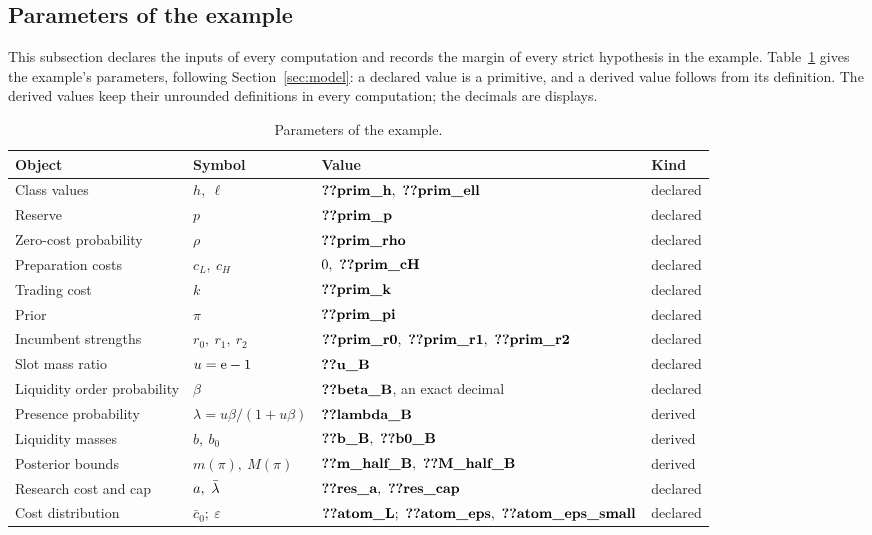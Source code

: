 \subsection{Parameters of the example}\label{app:parameters}

This subsection declares the inputs of every computation and records the margin of every strict hypothesis in the
example. Table~\ref{tab:a9-declarations} gives the example's parameters, following Section~\ref{sec:model}: a
declared value is a primitive, and a derived value follows from its definition. The derived values keep
their unrounded definitions in every computation; the decimals are displays.

\begin{table}[ht]
\centering
\caption{Parameters of the example.}\label{tab:a9-declarations}
\footnotesize
\begin{tabular}{@{}llll@{}}
\toprule
Object & Symbol & Value & Kind\\
\midrule
Class values & \(h,\ \ell\) & \(\reg{prim_h},\ \reg{prim_ell}\) & declared\\
Reserve & \(p\) & \(\reg{prim_p}\) & declared\\
Zero-cost probability & \(\rho\) & \(\reg{prim_rho}\) & declared\\
Preparation costs & \(c_L,\ c_H\) & \(0,\ \reg{prim_cH}\) & declared\\
Trading cost & \(k\) & \(\reg{prim_k}\) & declared\\
Prior & \(\pi\) & \(\reg{prim_pi}\) & declared\\
Incumbent strengths & \(r_0,\ r_1,\ r_2\) & \(\reg{prim_r0},\ \reg{prim_r1},\ \reg{prim_r2}\) & declared\\
Slot mass ratio & \(u=\mathrm{e}-1\) & \(\reg{u_B}\) & declared\\
Liquidity order probability & \(\beta\) & \(\reg{beta_B}\), an exact decimal & declared\\
Presence probability & \(\lambda=u\beta/(1+u\beta)\) & \(\reg{lambda_B}\) & derived\\
Liquidity masses & \(b,\ b_0\) & \(\reg{b_B},\ \reg{b0_B}\) & derived\\
Posterior bounds & \(m(\pi),\ M(\pi)\) & \(\reg{m_half_B},\ \reg{M_half_B}\) & derived\\
\midrule
Research cost and cap & \(a,\ \lb\) & \(\reg{res_a},\ \reg{res_cap}\) & declared\\
Cost distribution & \(\bar c_0;\ \varepsilon\) & \(\reg{atom_L};\ \reg{atom_eps},\ \reg{atom_eps_small}\) & declared\\

\end{tabular}
\end{table}
